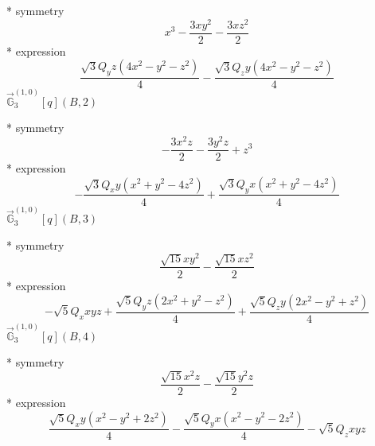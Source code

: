 \documentclass[fleqn,8pt]{jsarticle}
\begin{document}
\noindent\quad ** symmetry
\begin{dmath*}
x^{3} - \frac{3 x y^{2}}{2} - \frac{3 x z^{2}}{2}
\end{dmath*}
\noindent\quad ** expression
\begin{dmath*}
\frac{\sqrt{3} Q_{y} z \left(4 x^{2} - y^{2} - z^{2}\right)}{4} - \frac{\sqrt{3} Q_{z} y \left(4 x^{2} - y^{2} - z^{2}\right)}{4}
\end{dmath*}
\noindent\quad $\vec{\mathbb{G}}_{3}^{(1,0)}[q](B,2)$

\noindent\quad ** symmetry
\begin{dmath*}
- \frac{3 x^{2} z}{2} - \frac{3 y^{2} z}{2} + z^{3}
\end{dmath*}
\noindent\quad ** expression
\begin{dmath*}
- \frac{\sqrt{3} Q_{x} y \left(x^{2} + y^{2} - 4 z^{2}\right)}{4} + \frac{\sqrt{3} Q_{y} x \left(x^{2} + y^{2} - 4 z^{2}\right)}{4}
\end{dmath*}
\noindent\quad $\vec{\mathbb{G}}_{3}^{(1,0)}[q](B,3)$

\noindent\quad ** symmetry
\begin{dmath*}
\frac{\sqrt{15} x y^{2}}{2} - \frac{\sqrt{15} x z^{2}}{2}
\end{dmath*}
\noindent\quad ** expression
\begin{dmath*}
- \sqrt{5} Q_{x} x y z + \frac{\sqrt{5} Q_{y} z \left(2 x^{2} + y^{2} - z^{2}\right)}{4} + \frac{\sqrt{5} Q_{z} y \left(2 x^{2} - y^{2} + z^{2}\right)}{4}
\end{dmath*}
\noindent\quad $\vec{\mathbb{G}}_{3}^{(1,0)}[q](B,4)$

\noindent\quad ** symmetry
\begin{dmath*}
\frac{\sqrt{15} x^{2} z}{2} - \frac{\sqrt{15} y^{2} z}{2}
\end{dmath*}
\noindent\quad ** expression
\begin{dmath*}
\frac{\sqrt{5} Q_{x} y \left(x^{2} - y^{2} + 2 z^{2}\right)}{4} - \frac{\sqrt{5} Q_{y} x \left(x^{2} - y^{2} - 2 z^{2}\right)}{4} - \sqrt{5} Q_{z} x y z
\end{dmath*}
\end{document}
